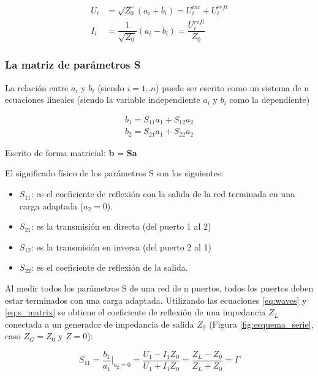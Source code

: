 \begin{equation}
\begin{aligned}
	U_i &= \sqrt{Z_0}(a_i + b_i) = U_i^{inc} + U_i^{refl}\\
	I_i &= \dfrac{1}{\sqrt{Z_0}}(a_i - b_i) = \dfrac{U_i^{refl}}{Z_0}
\end{aligned}
\end{equation}


\subsubsection{La matriz de parámetros S}

La relación entre $a_i$ y $b_i$ (siendo $i=1..n$) puede ser escrito como un sistema de n ecuaciones lineales (siendo la variable
independiente $a_i$ y $b_i$ como la dependiente)

\begin{equation}
\begin{aligned}
	b_1 = S_{11}a_1 + S_{12}a_2 \\
	b_2 = S_{21}a_1 + S_{22}a_2
\end{aligned}
\label{eq:s_matrix}
\end{equation}

Escrito de forma matricial: \textbf{b} = \textbf{Sa}

El significado físico de los parámetros S son los siguientes:
\begin{itemize}
	\item $S_{11}$: es el coeficiente de reflexión con la salida de la red terminada en una carga adaptada ($a_2 = 0$).
	\item $S_{21}$: es la transmisión en directa (del puerto 1 al 2)
	\item $S_{12}$: es la transmisión en inversa (del puerto 2 al 1)
	\item $S_{22}$: es el coeficiente de reflexión de la salida.
\end{itemize}

Al medir todos los parámetros S de una red de n puertos, todos los puertos deben estar terminados con una carga adaptada.
Utilizando las ecuaciones \ref{eq:waves} y \ref{eq:s_matrix} se obtiene el coeficiente de reflexión de una impedancia $Z_L$
conectada a un generador de impedancia de salida $Z_0$ (Figura \ref{fig:esquema_serie}, caso $Z_G = Z_0$ y $Z = 0$):

\begin{equation}
S_{11} = \dfrac{b_1}{a_1}\bigg|_{a_2=0} = \dfrac{U_1 - I_1Z_0}{U_1 + I_1Z_0} = \dfrac{Z_L - Z_0}{Z_L + Z_0} = \Gamma
\end{equation}


